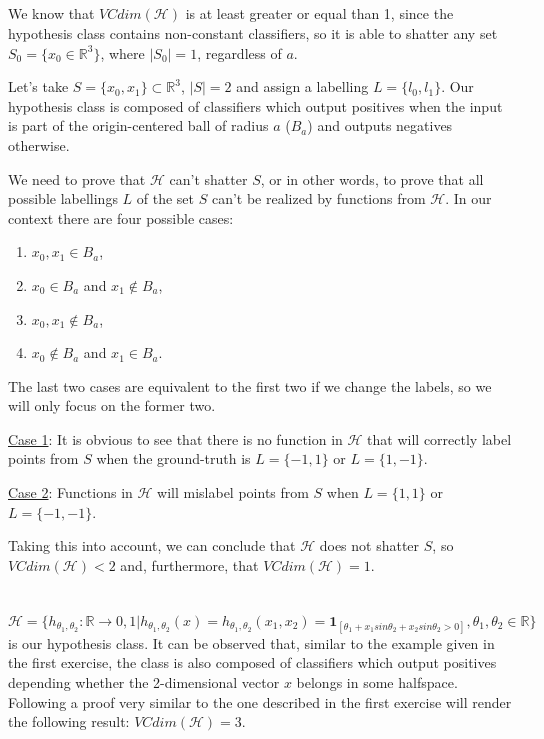 \documentclass{article}
\begin{document}
\subsection{}
We know that $VCdim(\mathcal{H})$ is at least greater or equal than 1, since the hypothesis class contains non-constant classifiers, so it is able to shatter any set $S_0=\{x_0\in\mathbb{R}^3\}$, where $|S_0|=1$, regardless of $a$.

Let's take $S=\{x_0, x_1\}\subset\mathbb{R}^3$, $|S|=2$ and assign a labelling $L=\{l_0,l_1\}$. Our hypothesis class is composed of classifiers which output positives when the input is part of the origin-centered ball of radius $a$ ($B_a$) and outputs negatives otherwise.

We need to prove that $\mathcal{H}$ can't shatter $S$, or in other words, to prove that all possible labellings $L$ of the set $S$ can't be realized by functions from $\mathcal{H}$. In our context there are four possible cases: 
\begin{enumerate}
	\item $x_0,x_1\in B_a$,
	\item $x_0\in B_a$ and $x_1\notin B_a$,
	\item $x_0,x_1\notin B_a$,
	\item $x_0\notin B_a$ and $x_1\in B_a$.
\end{enumerate}
The last two cases are equivalent to the first two if we change the labels, so we will only focus on the former two.

\underline{Case 1}: It is obvious to see that there is no function in $\mathcal{H}$ that will correctly label points from $S$ when the ground-truth is $L=\{-1,1\}$ or $L=\{1,-1\}$.

\underline{Case 2}: Functions in $\mathcal{H}$ will mislabel points from $S$ when $L=\{1,1\}$ or $L=\{-1,-1\}$.

Taking this into account, we can conclude that $\mathcal{H}$ does not shatter $S$, so $VCdim(\mathcal{H}) < 2$ and, furthermore, that $VCdim(\mathcal{H})=1$. 

\section{}
$\mathcal{H}=\{ h_{\theta_1,\theta_2}:\mathbb{R}\rightarrow{0,1}| h_{\theta_1,\theta_2}(x)=h_{\theta_1,\theta_2}(x_1,x_2)=\mathbf{1}_{[\theta_1+x_1sin\theta_2+x_2sin\theta_2>0]}, \theta_1,\theta_2 \in\mathbb{R}\}$ is our hypothesis class. It can be observed that, similar to the example given in the first exercise, the class is also composed of classifiers which output positives depending whether the 2-dimensional vector $x$ belongs in some halfspace. Following a proof very similar to the one described in the first exercise will render the following result: $VCdim(\mathcal{H})=3$.
\end{document}
